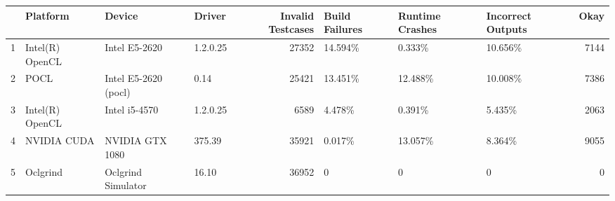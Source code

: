 \begin{tabular}{llllrlllr}
\toprule
{} &         Platform &                Device &    Driver &  Invalid Testcases & Build Failures & Runtime Crashes & Incorrect Outputs &  Okay \\
\midrule
1 &  Intel(R) OpenCL &         Intel E5-2620 &  1.2.0.25 &              27352 &        14.594\% &          0.333\% &           10.656\% &  7144 \\
2 &             POCL &  Intel E5-2620 (pocl) &      0.14 &              25421 &        13.451\% &         12.488\% &           10.008\% &  7386 \\
3 &  Intel(R) OpenCL &         Intel i5-4570 &  1.2.0.25 &               6589 &         4.478\% &          0.391\% &            5.435\% &  2063 \\
4 &      NVIDIA CUDA &       NVIDIA GTX 1080 &    375.39 &              35921 &         0.017\% &         13.057\% &            8.364\% &  9055 \\
5 &         Oclgrind &    Oclgrind Simulator &     16.10 &              36952 &              0 &               0 &                 0 &     0 \\
\bottomrule
\end{tabular}

